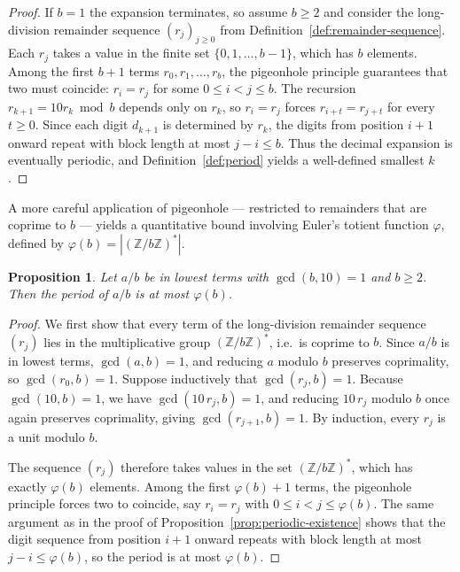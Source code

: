 \documentclass[12pt]{amsart}
\newtheorem{proposition}[theorem]{Proposition}
\theoremstyle{definition}
\theoremstyle{remark}
\newcommand{\Z}{\mathbb{Z}}
\begin{document}
\begin{proof}
If $b = 1$ the expansion terminates, so assume $b \ge 2$ and consider
the long-division remainder sequence $(r_j)_{j \ge 0}$ from
Definition~\ref{def:remainder-sequence}. Each $r_j$ takes a value in
the finite set $\{0, 1, \ldots, b - 1\}$, which has $b$ elements. Among
the first $b + 1$ terms $r_0, r_1, \ldots, r_b$, the pigeonhole
principle guarantees that two must coincide: $r_i = r_j$ for some
$0 \le i < j \le b$. The recursion $r_{k+1} = 10 r_k \bmod b$ depends
only on $r_k$, so $r_i = r_j$ forces $r_{i+t} = r_{j+t}$ for every
$t \ge 0$. Since each digit $d_{k+1}$ is determined by $r_k$, the
digits from position $i + 1$ onward repeat with block length at most
$j - i \le b$. Thus the decimal expansion is eventually periodic, and
Definition~\ref{def:period} yields a well-defined smallest $k$.
\end{proof}

A more careful application of pigeonhole — restricted to remainders
that are coprime to $b$ — yields a quantitative bound involving
Euler's totient function $\varphi$, defined by
$\varphi(b) = |(\Z/b\Z)^*|$.

\begin{proposition}\label{prop:phi-bound}
Let $a/b$ be in lowest terms with $\gcd(b, 10) = 1$ and $b \ge 2$.
Then the period of $a/b$ is at most $\varphi(b)$.
\end{proposition}

\begin{proof}
We first show that every term of the long-division remainder sequence
$(r_j)$ lies in the multiplicative group $(\Z/b\Z)^*$, i.e.\ is
coprime to $b$. Since $a/b$ is in lowest terms, $\gcd(a, b) = 1$, and
reducing $a$ modulo $b$ preserves coprimality, so $\gcd(r_0, b) = 1$.
Suppose inductively that $\gcd(r_j, b) = 1$. Because
$\gcd(10, b) = 1$, we have $\gcd(10\, r_j, b) = 1$, and reducing
$10\, r_j$ modulo $b$ once again preserves coprimality, giving
$\gcd(r_{j+1}, b) = 1$. By induction, every $r_j$ is a unit modulo
$b$.

The sequence $(r_j)$ therefore takes values in the set $(\Z/b\Z)^*$,
which has exactly $\varphi(b)$ elements. Among the first
$\varphi(b) + 1$ terms, the pigeonhole principle forces two to
coincide, say $r_i = r_j$ with $0 \le i < j \le \varphi(b)$. The same
argument as in the proof of Proposition~\ref{prop:periodic-existence}
shows that the digit sequence from position $i + 1$ onward repeats
with block length at most $j - i \le \varphi(b)$, so the period is at
most $\varphi(b)$.
\end{proof}
\end{document}
